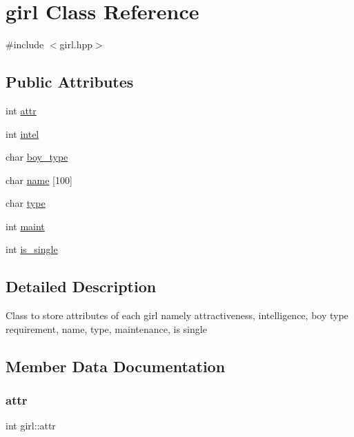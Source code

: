 \hypertarget{classgirl}{}\section{girl Class Reference}
\label{classgirl}


{\ttfamily \#include $<$girl.\+hpp$>$}

\subsection*{Public Attributes}
\begin{DoxyCompactItemize}
\item 
int \hyperlink{classgirl_a4251224ffb6c674917cd49b4b5ac5762}{attr}
\item 
int \hyperlink{classgirl_a909600ba1a2bd73d658c59421e6634f8}{intel}
\item 
char \hyperlink{classgirl_a4a3142c6754aeeb39d990b9dc0669376}{boy\+\_\+type}
\item 
char \hyperlink{classgirl_afa8c09d42cab3f3508ccf4d7a0091959}{name} \mbox{[}100\mbox{]}
\item 
char \hyperlink{classgirl_a65688d401c88cfaa9632d4f7758f02d1}{type}
\item 
int \hyperlink{classgirl_a27b54c74740855be0570b951ec43ec91}{maint}
\item 
int \hyperlink{classgirl_a1e490c984ffcfef201b8e80c192d47d3}{is\+\_\+single}
\end{DoxyCompactItemize}


\subsection{Detailed Description}
Class to store attributes of each girl namely attractiveness, intelligence, boy type requirement, name, type, maintenance, is single 

\subsection{Member Data Documentation}
\mbox{\label{classgirl_a4251224ffb6c674917cd49b4b5ac5762}} 
\subsubsection{\texorpdfstring{attr}{attr}}
{\footnotesize\ttfamily int girl\+::attr}

